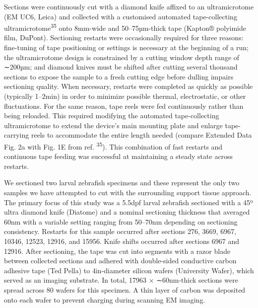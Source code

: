 \documentclass{article}
\begin{document}
Sections were continuously cut with a diamond knife affixed to an ultramicrotome (EM UC6, Leica) and collected with a customised automated tape-collecting ultramicrotome\textsuperscript{35} onto 8mm-wide and 50–75µm-thick tape (Kapton® polyimide film, DuPont). Sectioning restarts were occasionally required for three reasons: fine-tuning of tape positioning or settings is necessary at the beginning of a run; the ultramicrotome design is constrained by a cutting window depth range of ∼200µm; and diamond knives must be shifted after cutting several thousand sections to expose the sample to a fresh cutting edge before dulling impairs sectioning quality. When necessary, restarts were completed as quickly as possible (typically 1–2min) in order to minimize possible thermal, electrostatic, or other fluctuations. For the same reason, tape reels were fed continuously rather than being reloaded. This required modifying the automated tape-collecting ultramicrotome to extend the device’s main mounting plate and enlarge tape-carrying reels to accommodate the entire length needed (compare Extended Data Fig. 2a with Fig. 1E from ref. \textsuperscript{35}). This combination of fast restarts and continuous tape feeding was successful at maintaining a steady state across restarts.

We sectioned two larval zebrafish specimens and these represent the only two samples we have attempted to cut with the surrounding support tissue approach. The primary focus of this study was a 5.5dpf larval zebrafish sectioned with a 45º ultra diamond knife (Diatome) and a nominal sectioning thickness that averaged 60nm with a variable setting ranging from 50–70nm depending on sectioning consistency. Restarts for this sample occurred after sections 276, 3669, 6967, 10346, 12523, 12916, and 15956. Knife shifts occurred after sections 6967 and 12916. After sectioning, the tape was cut into segments with a razor blade between collected sections and adhered with double-sided conductive carbon adhesive tape (Ted Pella) to 4in-diameter silicon wafers (University Wafer), which served as an imaging substrate. In total, 17963 × ∼60nm-thick sections were spread across 80 wafers for this specimen. A thin layer of carbon was deposited onto each wafer to prevent charging during scanning EM imaging.
\end{document}

